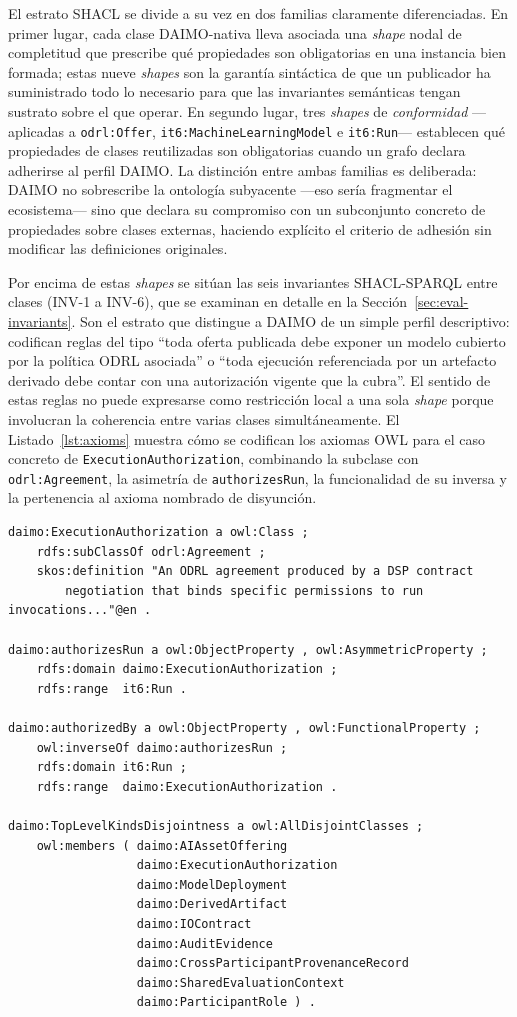 \documentclass[11pt,a4paper]{article}
\newcommand{\code}[1]{\texttt{#1}}
\begin{document}
El estrato SHACL se divide a su vez en dos familias claramente diferenciadas. En primer lugar, cada clase DAIMO-nativa lleva asociada una \emph{shape} nodal de completitud que prescribe qué propiedades son obligatorias en una instancia bien formada; estas nueve \emph{shapes} son la garantía sintáctica de que un publicador ha suministrado todo lo necesario para que las invariantes semánticas tengan sustrato sobre el que operar. En segundo lugar, tres \emph{shapes} de \emph{conformidad} ---aplicadas a \code{odrl:Offer}, \code{it6:MachineLearningModel} e \code{it6:Run}--- establecen qué propiedades de clases reutilizadas son obligatorias cuando un grafo declara adherirse al perfil DAIMO. La distinción entre ambas familias es deliberada: DAIMO no sobrescribe la ontología subyacente ---eso sería fragmentar el ecosistema--- sino que declara su compromiso con un subconjunto concreto de propiedades sobre clases externas, haciendo explícito el criterio de adhesión sin modificar las definiciones originales.

Por encima de estas \emph{shapes} se sitúan las seis invariantes SHACL-SPARQL entre clases (INV-1 a INV-6), que se examinan en detalle en la Sección~\ref{sec:eval-invariants}. Son el estrato que distingue a DAIMO de un simple perfil descriptivo: codifican reglas del tipo ``toda oferta publicada debe exponer un modelo cubierto por la política ODRL asociada'' o ``toda ejecución referenciada por un artefacto derivado debe contar con una autorización vigente que la cubra''. El sentido de estas reglas no puede expresarse como restricción local a una sola \emph{shape} porque involucran la coherencia entre varias clases simultáneamente. El Listado~\ref{lst:axioms} muestra cómo se codifican los axiomas OWL para el caso concreto de \code{ExecutionAuthorization}, combinando la subclase con \code{odrl:Agreement}, la asimetría de \code{authorizesRun}, la funcionalidad de su inversa y la pertenencia al axioma nombrado de disyunción.

\begin{lstlisting}[label=lst:axioms,caption={Axiomas centrales alrededor de \code{ExecutionAuthorization}.}]
daimo:ExecutionAuthorization a owl:Class ;
    rdfs:subClassOf odrl:Agreement ;
    skos:definition "An ODRL agreement produced by a DSP contract
        negotiation that binds specific permissions to run invocations..."@en .

daimo:authorizesRun a owl:ObjectProperty , owl:AsymmetricProperty ;
    rdfs:domain daimo:ExecutionAuthorization ;
    rdfs:range  it6:Run .

daimo:authorizedBy a owl:ObjectProperty , owl:FunctionalProperty ;
    owl:inverseOf daimo:authorizesRun ;
    rdfs:domain it6:Run ;
    rdfs:range  daimo:ExecutionAuthorization .

daimo:TopLevelKindsDisjointness a owl:AllDisjointClasses ;
    owl:members ( daimo:AIAssetOffering
                  daimo:ExecutionAuthorization
                  daimo:ModelDeployment
                  daimo:DerivedArtifact
                  daimo:IOContract
                  daimo:AuditEvidence
                  daimo:CrossParticipantProvenanceRecord
                  daimo:SharedEvaluationContext
                  daimo:ParticipantRole ) .
\end{lstlisting}
\end{document}
